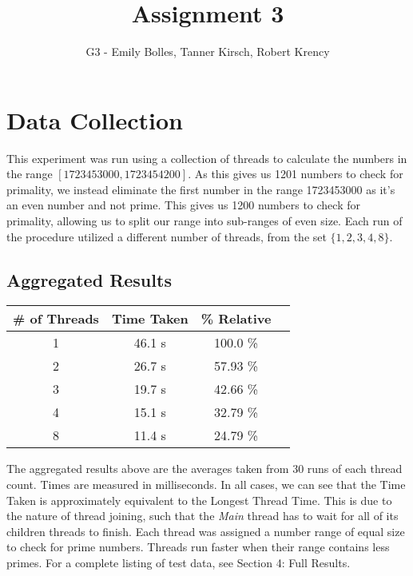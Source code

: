 \documentclass[12pt]{article}
\title{Assignment 3}
\author{G3 - Emily Bolles, Tanner Kirsch, Robert Krency}
\date{}
\begin{document}
\maketitle

\section{Data Collection}

This experiment was run using a collection of threads to calculate the numbers in the range \([1723453000,1723454200]\).
As this gives us 1201 numbers to check for primality, we instead eliminate the first number in the range 1723453000 as it's an even number and not prime.
This gives us 1200 numbers to check for primality, allowing us to split our range into sub-ranges of even size.
Each run of the procedure utilized a different number of threads, from the set \(\{1,2,3,4,8\}\).

\subsection{Aggregated Results}

\begin{center}
    \begin{tabular}{| c | c | c | c |}
        \hline
        \textbf{\# of Threads} & \textbf{Time Taken} & \textbf{\% Relative} \\ \hline
        1 & 46.1 s & 100.0 \% \\ \hline
        2 & 26.7 s & 57.93 \% \\ \hline
        3 & 19.7 s & 42.66 \% \\ \hline
        4 & 15.1 s & 32.79 \% \\ \hline
        8 & 11.4 s & 24.79 \% \\ \hline
    \end{tabular}
\end{center}

The aggregated results above are the averages taken from 30 runs of each thread count. 
Times are measured in milliseconds.
In all cases, we can see that the Time Taken is approximately equivalent to the Longest Thread Time.
This is due to the nature of thread joining, such that the \textit{Main} thread has to wait for all of its children threads to finish.
Each thread was assigned a number range of equal size to check for prime numbers.
Threads run faster when their range contains less primes. 
For a complete listing of test data, see Section 4: Full Results.
\end{document}
